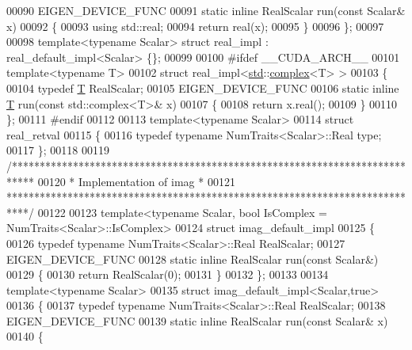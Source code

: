 \begin{DoxyCode}
00090   EIGEN\_DEVICE\_FUNC
00091   \textcolor{keyword}{static} \textcolor{keyword}{inline} RealScalar run(\textcolor{keyword}{const} Scalar& x)
00092   \{
00093     \textcolor{keyword}{using} std::real;
00094     \textcolor{keywordflow}{return} real(x);
00095   \}
00096 \};
00097 
00098 \textcolor{keyword}{template}<\textcolor{keyword}{typename} Scalar> \textcolor{keyword}{struct }real\_impl : real\_default\_impl<Scalar> \{\};
00099 
00100 \textcolor{preprocessor}{#ifdef \_\_CUDA\_ARCH\_\_}
00101 \textcolor{keyword}{template}<\textcolor{keyword}{typename} T>
00102 \textcolor{keyword}{struct }real\_impl<\hyperlink{namespacestd}{std}::\hyperlink{structcomplex}{complex}<T> >
00103 \{
00104   \textcolor{keyword}{typedef} \hyperlink{group___sparse_core___module_class_eigen_1_1_triplet}{T} RealScalar;
00105   EIGEN\_DEVICE\_FUNC
00106   \textcolor{keyword}{static} \textcolor{keyword}{inline} \hyperlink{group___sparse_core___module_class_eigen_1_1_triplet}{T} run(\textcolor{keyword}{const} std::complex<T>& x)
00107   \{
00108     \textcolor{keywordflow}{return} x.real();
00109   \}
00110 \};
00111 \textcolor{preprocessor}{#endif}
00112 
00113 \textcolor{keyword}{template}<\textcolor{keyword}{typename} Scalar>
00114 \textcolor{keyword}{struct }real\_retval
00115 \{
00116   \textcolor{keyword}{typedef} \textcolor{keyword}{typename} NumTraits<Scalar>::Real type;
00117 \};
00118 
00119 \textcolor{comment}{/****************************************************************************}
00120 \textcolor{comment}{* Implementation of imag                                                 *}
00121 \textcolor{comment}{****************************************************************************/}
00122 
00123 template<typename Scalar, bool IsComplex = NumTraits<Scalar>::IsComplex>
00124 \textcolor{keyword}{struct }imag\_default\_impl
00125 \{
00126   \textcolor{keyword}{typedef} \textcolor{keyword}{typename} NumTraits<Scalar>::Real RealScalar;
00127   EIGEN\_DEVICE\_FUNC
00128   \textcolor{keyword}{static} \textcolor{keyword}{inline} RealScalar run(\textcolor{keyword}{const} Scalar&)
00129   \{
00130     \textcolor{keywordflow}{return} RealScalar(0);
00131   \}
00132 \};
00133 
00134 \textcolor{keyword}{template}<\textcolor{keyword}{typename} Scalar>
00135 \textcolor{keyword}{struct }imag\_default\_impl<Scalar,true>
00136 \{
00137   \textcolor{keyword}{typedef} \textcolor{keyword}{typename} NumTraits<Scalar>::Real RealScalar;
00138   EIGEN\_DEVICE\_FUNC
00139   \textcolor{keyword}{static} \textcolor{keyword}{inline} RealScalar run(\textcolor{keyword}{const} Scalar& x)
00140   \{

\end{DoxyCode}
